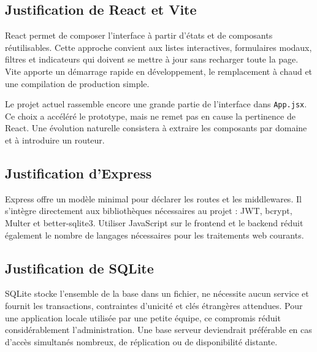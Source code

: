 \documentclass[12pt,a4paper,oneside]{report}
\newcommand{\code}[1]{\texttt{#1}}
\begin{document}
\subsection{Justification de React et Vite}
React permet de composer l'interface à partir d'états et de composants réutilisables. Cette approche convient aux listes interactives, formulaires modaux, filtres et indicateurs qui doivent se mettre à jour sans recharger toute la page. Vite apporte un démarrage rapide en développement, le remplacement à chaud et une compilation de production simple.

Le projet actuel rassemble encore une grande partie de l'interface dans \code{App.jsx}. Ce choix a accéléré le prototype, mais ne remet pas en cause la pertinence de React. Une évolution naturelle consistera à extraire les composants par domaine et à introduire un routeur.

\subsection{Justification d'Express}
Express offre un modèle minimal pour déclarer les routes et les middlewares. Il s'intègre directement aux bibliothèques nécessaires au projet : JWT, bcrypt, Multer et better-sqlite3. Utiliser JavaScript sur le frontend et le backend réduit également le nombre de langages nécessaires pour les traitements web courants.

\subsection{Justification de SQLite}
SQLite stocke l'ensemble de la base dans un fichier, ne nécessite aucun service et fournit les transactions, contraintes d'unicité et clés étrangères attendues. Pour une application locale utilisée par une petite équipe, ce compromis réduit considérablement l'administration. Une base serveur deviendrait préférable en cas d'accès simultanés nombreux, de réplication ou de disponibilité distante.
\end{document}
